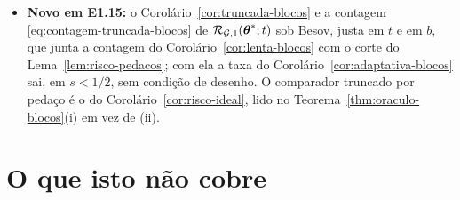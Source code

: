 \documentclass[11pt,a4paper]{article}
\newcommand{\lmaxx}{\lambda_{\max}}
\newcommand{\Gcal}{\mathcal{G}}
\begin{document}
\begin{itemize}[nosep, leftmargin=*]
    $\lmaxx(\Gramhat)$ acima do teto \eqref{eq:mu-blocos}; o ganho em logaritmo
    sobre o LASSO em (iii)(b) e em (iv).
  \item \textbf{Novo em E1.15:} o Corolário~\ref{cor:truncada-blocos} e a
    contagem \eqref{eq:contagem-truncada-blocos} de
    $\mathcal{R}_{\Gcal,1}(\thetastar;t)$ sob Besov, justa em $t$ e em $b$, que
    junta a contagem do Corolário~\ref{cor:lenta-blocos} com o corte do
    Lema~\ref{lem:risco-pedacos}; com ela a taxa do
    Corolário~\ref{cor:adaptativa-blocos} sai, em $s < 1/2$, sem condição de
    desenho. O comparador truncado por pedaço é o do
    Corolário~\ref{cor:risco-ideal}, lido no Teorema~\ref{thm:oraculo-blocos}(i)
    em vez de (ii).
\end{itemize}

\section{O que isto não cobre}
\end{document}
